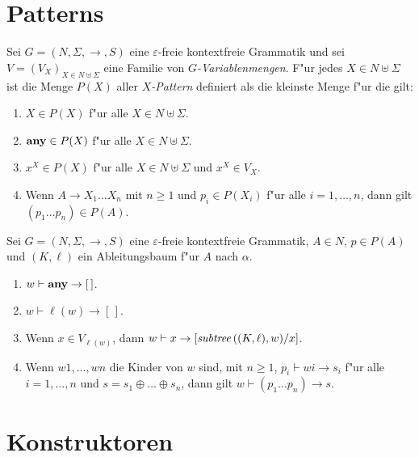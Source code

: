 \documentclass[12pt,a4paper]{article}
\begin{document}
\section{Patterns}

\begin{definition}[Patterns]
  Sei $G = (N,\Sigma,\to,S)$ eine $\varepsilon$-freie kontextfreie Grammatik und sei
  $V = (V_X)_{X\in N \uplus \Sigma}$ eine Familie von \emph{$G$-Variablenmengen}. F"ur
  jedes $X \in N \uplus \Sigma$ ist die Menge $P(X)$ aller \emph{$X$-Pattern}
  definiert als die kleinste Menge f"ur die gilt:
  \begin{enumerate}
  \item $X \in P(X)$ f"ur alle $X \in N \uplus \Sigma$.
  \item $\mathbf{any} \in P(X)$ f"ur alle $X \in N \uplus \Sigma$.
  \item $x^X \in P(X)$ f"ur alle $X \in N \uplus \Sigma$ und $x^X \in V_X$.
  \item Wenn $A \to X_1 \ldots X_n$ mit $n \ge 1$ und $p_i \in P(X_i)$ f"ur alle $i=1,\ldots,n$,
    dann gilt $(p_1 \ldots p_n) \in P(A)$.
  \end{enumerate}
\end{definition}

\begin{definition}[Patternmatching]
  Sei $G = (N,\Sigma,\to,S)$ eine $\varepsilon$-freie kontextfreie Grammatik,
  $A \in N$, $p \in P(A)$ und $(K,\ell)$ ein Ableitungsbaum f"ur $A$ nach $\alpha$. 
  \begin{enumerate}
  \item $w \vdash \mathbf{any} \to [\,]$.
  \item $w \vdash \ell(w) \to [\,]$.
  \item Wenn $x \in V_{\ell(w)}$, dann $w \vdash x \to [\mathit{subtree}\,((K,\ell),w)/x]$.
  \item Wenn $w1,\ldots,wn$ die Kinder von $w$ sind, mit $n \ge 1$, $p_i \vdash wi \to s_i$ f"ur alle
    $i=1,\ldots,n$ und $s = s_1 \oplus \ldots \oplus s_n$, dann gilt $w \vdash (p_1 \ldots p_n) \to s$.
  \end{enumerate}
\end{definition}


\section{Konstruktoren}
\end{document}
